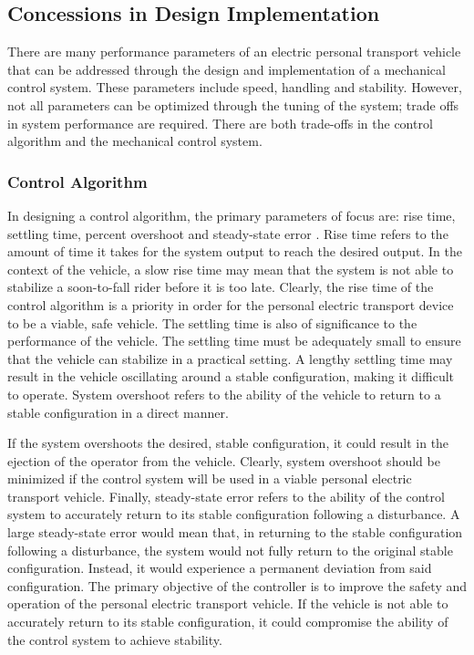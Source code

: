 \subsection{Concessions in Design Implementation} \label{sec:Tradeoff}
There are many performance parameters of an electric personal transport vehicle that can be addressed through the design and implementation of a mechanical control system. 
These parameters include speed, handling and stability. 
However, not all parameters can be optimized through the tuning of the system; trade offs in system performance are required. 
There are both trade-offs in the control algorithm and the mechanical control system.

\subsubsection{Control Algorithm}                                                                                                                         
In designing a control algorithm, the primary parameters of focus are: rise time, settling time, percent overshoot and steady-state error \cite{Bees}. 
Rise time refers to the amount of time it takes for the system output to reach the desired output. 
In the context of the vehicle, a slow rise time may mean that the system is not able to stabilize a soon-to-fall rider before it is too late. 
Clearly, the rise time of the control algorithm is a priority in order for the personal electric transport device to be a viable, safe vehicle.
The settling time is also of significance to the performance of the vehicle. 
The settling time must be adequately small to ensure that the vehicle can stabilize in a practical setting. 
A lengthy settling time may result in the vehicle oscillating around a stable configuration, making it difficult to operate. 
System overshoot refers to the ability of the vehicle to return to a stable configuration in a direct manner. 

If the system overshoots the desired, stable configuration, it could result in the ejection of the operator from the vehicle. 
Clearly, system overshoot should be minimized if the control system will be used in a viable personal electric transport vehicle. 
Finally, steady-state error refers to the ability of the control system to accurately return to its stable configuration following a disturbance. 
A large steady-state error would mean that, in returning to the stable configuration following a disturbance, the system would not fully return to the original stable configuration. 
Instead, it would experience a permanent deviation from said configuration. 
The primary objective of the controller is to improve the safety and operation of the personal electric transport vehicle.                             
If the vehicle is not able to accurately return to its stable configuration, it could compromise the ability of the control system to achieve stability.

